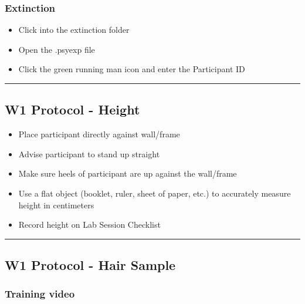 \documentclass[
]{book}
\providecommand{\tightlist}{%
  \setlength{\itemsep}{0pt}\setlength{\parskip}{0pt}}
\begin{document}
\hypertarget{extinction}{%
\subsubsection{Extinction}\label{extinction}}

\begin{itemize}
\tightlist
\item
  Click into the extinction folder
\item
  Open the .psyexp file
\item
  Click the green running man icon and enter the Participant ID
\end{itemize}

\begin{center}\rule{0.5\linewidth}{0.5pt}\end{center}

\hypertarget{w1-protocol---height}{%
\subsection{W1 Protocol - Height}\label{w1-protocol---height}}

\begin{itemize}
\tightlist
\item
  Place participant directly against wall/frame
\item
  Advise participant to stand up straight
\item
  Make sure heels of participant are up against the wall/frame
\item
  Use a flat object (booklet, ruler, sheet of paper, etc.) to accurately measure height in centimeters
\item
  Record height on Lab Session Checklist
\end{itemize}

\begin{center}\rule{0.5\linewidth}{0.5pt}\end{center}

\hypertarget{w1-protocol---hair-sample}{%
\subsection{W1 Protocol - Hair Sample}\label{w1-protocol---hair-sample}}

\hypertarget{training-video}{%
\subsubsection{Training video}\label{training-video}}
\end{document}
